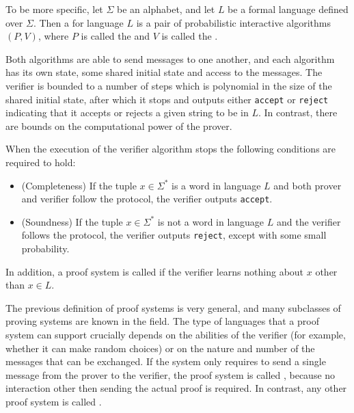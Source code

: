 To be more specific, let $\Sigma$ be an alphabet, and let $L$ be a formal language defined over $\Sigma$. Then a  for language $L$ is a pair of probabilistic interactive algorithms $(P,V)$, where $P$ is called the  and $V$ is called the . 

Both algorithms are able to send messages to one another, and each algorithm has its own state, some shared initial state and access to the messages. The verifier is bounded to a number of steps which is polynomial in the size of the shared initial state, after which it stops and outputs either \texttt{accept} or \texttt{reject} indicating that it accepts or rejects a given string to be in $L$. In contrast, there are bounds on the computational power of the prover.

When the execution of the verifier algorithm stops the following conditions are required to hold:
\begin{itemize}
\item (Completeness) If the tuple $x\in \Sigma^*$ is a word in language $L$ and both prover and verifier follow the protocol, the verifier outputs \texttt{accept}.
\item (Soundness) If the tuple $x\in \Sigma^*$ is not a word in language $L$ and the verifier follows the protocol, the verifier outputs \texttt{reject}, except with some small probability.
\end{itemize}
In addition, a proof system is called  if the verifier learns nothing about $x$ other than $x\in L$. 

The previous definition of proof systems is very general, and many subclasses of proving systems are known in the field. The type of languages that a proof system can support crucially depends on the abilities of the verifier (for example, whether it can make random choices) or on the nature and number of the messages that can be exchanged. If the system only requires to send a single message from the prover to the verifier, the proof system is called , because no interaction other then sending the actual proof is required. In contrast, any other proof system is called .

